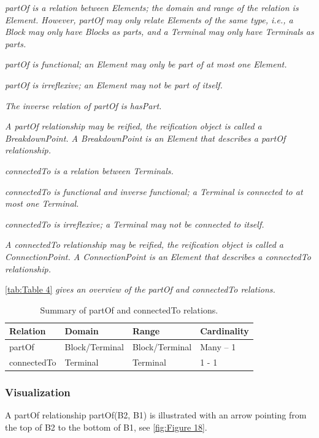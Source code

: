 {\itshape
partOf is a relation between Elements; the domain and range of the relation is Element. However, partOf may only
relate Elements of the same type, i.e., a Block may only have Blocks as parts, and a Terminal may only have Terminals
as parts.}

{\itshape
partOf is functional; an Element may only be part of at most one Element.}

{\itshape
partOf is irreflexive; an Element may not be part of itself.}

{\itshape
The inverse relation of partOf is hasPart.}

\textit{{A partOf relationship may be reified, the reification object
      is called a BreakdownPoint. A BreakdownPoint is an Element that describes a partOf relationship. }}

{\itshape
  connectedTo is a relation between Terminals.  }

{\itshape
  connectedTo is functional and inverse functional; a Terminal is connected to at most one Terminal.}

{\itshape
  connectedTo is irreflexive; a Terminal may not be connected to itself.}

{\itshape
  A connectedTo relationship may be reified, the reification object is called a ConnectionPoint. A ConnectionPoint is an
  Element that describes a connectedTo relationship.}

\autoref{tab:Table 4}\textit{{ gives an overview of the partOf and connectedTo
      relations.}}

\begin{table}[htb]
  \centering
  \caption{Summary of partOf and connectedTo relations.}\label{tab:Table 4}
  \begin{supertabular}{|m{1.2962599in}|m{1.7913599in}|m{1.6934599in}|m{1.3968599in}|}
    \hline
    {\bfseries Relation} &
    {\bfseries Domain} &
    {\bfseries Range} &
    {\bfseries Cardinality}\\\hline
    { partOf} &
    { Block/Terminal} &
    { Block/Terminal} &
    { Many -- 1}\\\hline
    {connectedTo} &
    { Terminal} &
    { Terminal} &
    { 1 - 1}\\\hline
  \end{supertabular}
\end{table}

\subsubsection{Visualization}
A partOf relationship partOf(B2, B1) is illustrated with an arrow pointing from the top of B2 to the bottom of B1, see \autoref{fig:Figure 18}.

